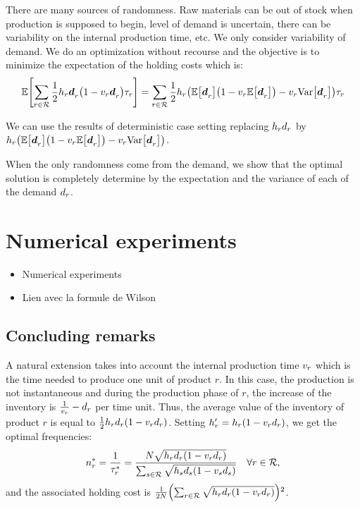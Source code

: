 
There are many sources of randomness. Raw materials can be out of stock when production is supposed to begin, level of demand is uncertain, there can be variability on the internal production time, etc. We only consider variability of demand. We do an optimization without recourse and the objective is to minimize the expectation of the holding costs which is:
\begin{equation}
  \espe\sqbracket{\sum_{r\in\REF} \frac{1}{2}\holding_r\va\demand_r\bracket{1-\internal_r\va\demand_r}\cover_r}
  = 
  \sum_{r\in\REF} \frac{1}{2}\holding_r\bracket{\espe\sqbracket{\va\demand_r}\bracket{1-\internal_r\espe\sqbracket{\va\demand_r}}-\internal_r\vari\sqbracket{\va\demand_r}}\cover_r
\end{equation}

We can use the results of deterministic case setting replacing $h_rd_r$ by $\holding_r\bracket{\espe\sqbracket{\va\demand_r}\bracket{1-\internal_r\espe\sqbracket{\va\demand_r}}-\internal_r\vari\sqbracket{\va\demand_r}}$.


When the only randomness come from the demand, we show that the optimal solution is completely determine by the expectation and the variance of each of the demand $d_r$.


\section{Numerical experiments}

\begin{itemize}
  \item Numerical experiments
  \item Lien avec la formule de Wilson
\end{itemize}


\subsection{Concluding remarks}



A natural extension takes into account the internal production time $v_r$ which is the time needed to produce one unit of product $r$. In this case, the production is not instantaneous and during the production phase of $r$, the increase of the inventory is $\frac{1}{v_r}-d_r$ per time unit. Thus, the average value of the inventory of product $r$ is equal to $\frac{1}{2}\holding_r\demand_r\bracket{1-\internal_r\demand_r}$. Setting $\holding_r'=\holding_r\bracket{1-\internal_r\demand_r}$, we get the optimal frequencies:
\begin{equation}
  \freq_r^* = \frac{1}{\cover_r^*}
            = \frac{\nbsetups\sqrt{\holding_r\demand_r\bracket{1-\internal_r\demand_r}}}{\sum_{s\in\REF}\sqrt{\holding_s\demand_s\bracket{1-\internal_s\demand_s}}}
            \quad \forall r\in\REF,
\end{equation}
and the associated holding cost is $\frac{1}{2\nbsetups}\bracket{\sum_{r\in\REF}\sqrt{\holding_r\demand_r\bracket{1-\internal_r\demand_r}}}^2$.

